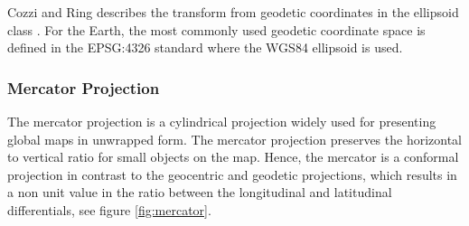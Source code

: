 Cozzi and Ring describes the transform from geodetic coordinates in the ellipsoid class \cite[p. 25]{cozzi11}. For the Earth, the most commonly used geodetic coordinate space is defined in the EPSG:4326 standard where the WGS84 ellipsoid is used.

\subsubsection{Mercator Projection}

The mercator projection is a cylindrical projection widely used for presenting global maps in unwrapped form. The mercator projection preserves the horizontal to vertical ratio for small objects on the map. Hence, the mercator is a conformal projection in contrast to the geocentric and geodetic projections, which results in a non unit value in the ratio between the longitudinal and latitudinal differentials, see figure \ref{fig:mercator}.

